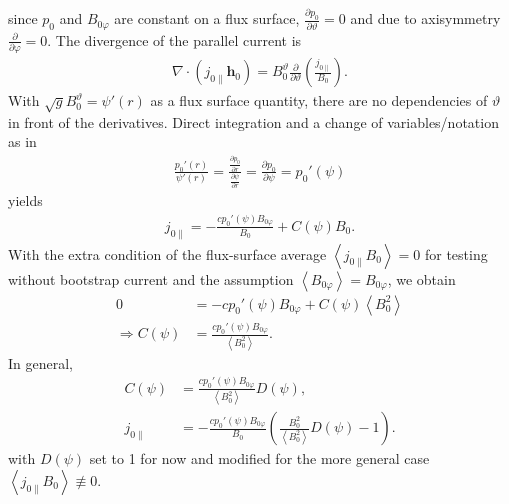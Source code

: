 \documentclass[a4paper, 10pt, english]{article}
\let\temp\vartheta
\let\vartheta\theta
\let\theta\temp
\let\temp\varphi
\let\varphi\phi
\let\phi\temp
\let\vec\symbf
\newcommand*\pd[2][]{\ensuremath{\frac{\partial #1}{\partial #2}}}  %
\begin{document}
since $p_{0}$ and $B_{0 \phi}$ are constant on a flux surface, $\pd[p_{0}]{\theta} = 0$ and due to axisymmetry $\pd{\phi} = 0$. The divergence of the parallel current is
\begin{gather}
  \nabla \cdot(j_{0 \parallel} \vec{h}_{0}) = B_{0}^{\theta} \pd{\theta} \left( \frac{j_{0 \parallel}}{B_{0}} \right).
\end{gather}
With $\sqrt{g} B_{0}^{\theta} = \psi'(r)$ as a flux surface quantity, there are no dependencies of $\theta$ in front of the derivatives. Direct integration and a change of variables/notation as in
\begin{gather}
  \frac{p_{0}'(r)}{\psi'(r)} = \frac{\pd[p_{0}]{r}}{\pd[\psi]{r}} = \pd[p_{0}]{\psi} = p_{0}'(\psi)
\end{gather}
yields
\begin{gather}
  j_{0 \parallel} = -\frac{c p_{0}'(\psi) B_{0 \phi}}{B_{0}} + C(\psi) B_{0}.
\end{gather}
With the extra condition of the flux-surface average $\left\langle j_{0 \parallel} B_{0} \right\rangle = 0$ for testing without bootstrap current and the assumption $\left\langle B_{0 \phi} \right\rangle = B_{0 \phi}$, we obtain
\begin{align}
  0 &= -c p_{0}'(\psi) B_{0 \phi} + C(\psi) \left\langle B_{0}^{2} \right\rangle \nonumber \\
  \Rightarrow C(\psi) &= \frac{c p_{0}'(\psi) B_{0 \phi}}{\left\langle B_{0}^{2} \right\rangle}.
\end{align}
In general, 
\begin{align}
  C(\psi) &= \frac{c p_{0}'(\psi) B_{0 \phi}}{\left\langle B_{0}^{2} \right\rangle} D(\psi), \\
  j_{0 \parallel} &= -\frac{c p_{0}'(\psi) B_{0 \phi}}{B_{0}} \left( \frac{B_{0}^{2}}{\left\langle B_{0}^{2} \right\rangle} D(\psi) - 1 \right).
\end{align}
with $D(\psi)$ set to 1 for now and modified for the more general case $\left\langle j_{0 \parallel} B_{0} \right\rangle \not\equiv 0$.
\end{document}

